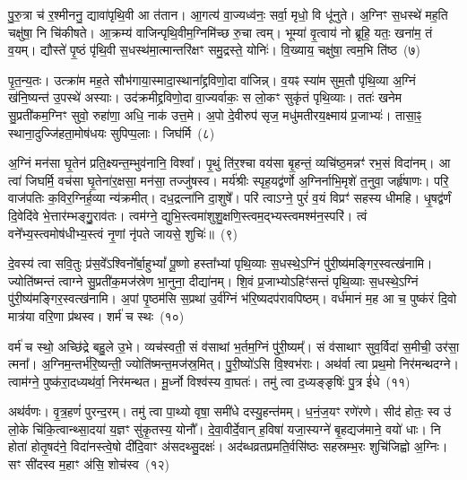 पु॒रु॒त्रा च॑ र॒श्मीननु॒ द्यावा॑पृथि॒वी आ त॑तान। आ॒गत्य॑ वा॒ज्यध्व॑नः॒ सर्वा॒ मृधो॒ वि धू॑नुते। अ॒ग्निꣳ स॒धस्थे॑ मह॒ति चक्षु॑षा॒ नि चि॑कीषते। आ॒क्रम्य॑ वाजिन्पृथि॒वीम॒ग्निमि॑च्छ रु॒चा त्वम्। भूम्या॑ वृ॒त्वाय॑ नो ब्रूहि॒ यतः॒ खना॑म॒ तं व॒यम्। द्यौस्ते॑ पृ॒ष्ठं पृ॑थि॒वी स॒धस्थ॑मा॒त्मान्तरि॑क्षꣳ समु॒द्रस्ते॒ योनिः॑। वि॒ख्याय॒ चक्षु॑षा॒ त्वम॒भि ति॑ष्ठ~(७)

पृ॒त॒न्य॒तः। उत्क्रा॑म मह॒ते सौभ॑गाया॒स्मादा॒स्थाना᳚द्द्रविणो॒दा वा॑जिन्न्। व॒यꣴ स्या॑म सुम॒तौ पृ॑थि॒व्या अ॒ग्निं ख॑नि॒ष्यन्त॑ उ॒पस्थे॑ अस्याः। उद॑क्रमीद्द्रविणो॒दा वा॒ज्यर्वाकः॒ स लो॒कꣳ सुकृ॑तं पृथि॒व्याः। ततः॑ खनेम सु॒प्रती॑कम॒ग्निꣳ सुवो॒ रुहा॑णा॒ अधि॒ नाक॑ उत्त॒मे। अ॒पो दे॒वीरुप॑ सृज॒ मधु॑मतीरय॒क्ष्माय॑ प्र॒जाभ्यः॑। तासा॒ꣴ॒ स्थाना॒दुज्जि॑हता॒मोष॑धयः सुपिप्प॒लाः। जिघ॑र्मि~(८)

अ॒ग्निं मन॑सा घृ॒तेन॑ प्रति॒क्ष्यन्त॒म्भुव॑नानि॒ विश्वा᳚। पृ॒थुं ति॑र॒श्चा वय॑सा बृ॒हन्तं॒ व्यचि॑ष्ठ॒मन्नꣳ॑ रभ॒सं विदा॑नम्। आ त्वा॑ जिघर्मि॒ वच॑सा घृ॒तेना॑र॒क्षसा॒ मन॑सा॒ तज्जु॑षस्व। मर्य॑श्रीः स्पृह॒यद्व॑र्णो अ॒ग्निर्नाभि॒मृशे॑ त॒नुवा॒ जर्\mbox{}हृ॑षाणः। परि॒ वाज॑पतिः क॒विर॒ग्निर्\mbox{}ह॒व्या न्य॑क्रमीत्। दध॒द्रत्ना॑नि दा॒शुषे᳚। परि॑ त्वाऽग्ने॒ पुरं॑ व॒यं विप्रꣳ॑ सहस्य धीमहि। धृ॒षद्व॑र्णं दि॒वेदि॑वे भे॒त्तार॑म्भङ्गु॒॒राव॑तः। त्वम॑ग्ने॒ द्युभि॒स्त्वमा॑शुशु॒क्षणि॒स्त्वम॒द्भ्यस्त्वमश्म॑न॒स्परि॑। त्वं वने᳚भ्य॒स्त्वमोष॑धीभ्य॒स्त्वं नृ॒णां नृ॑पते जायसे॒ शुचिः॑॥~(९)

{\anuvakamend[{प्र॒तूर्व॒न्थ्सूर्य॑स्य तिष्ठ॒ जिघ॑र्मि भे॒त्तारं॑ विꣳश॒तिश्च॑}]}%

दे॒वस्य॑ त्वा सवि॒तुः प्र॑स॒वे᳚\-ऽश्विनो᳚र्बा॒हु\-भ्यां᳚ पू॒ष्णो हस्ता᳚भ्यां पृथि॒व्याः स॒धस्थे॒\-ऽग्निं पु॑री॒ष्य॑मङ्गिर॒स्व\-त्ख॑नामि। ज्योति॑ष्मन्तं त्वाग्ने सु॒प्रती॑क॒मज॑स्रेण भा॒नुना॒ दीद्या॑नम्। शि॒वं प्र॒जाभ्यो\-ऽहिꣳ॑सन्तं पृथि॒व्याः स॒धस्थे॒\-ऽग्निं पु॑री॒ष्य॑मङ्गिर॒स्वत्ख॑नामि। अ॒पां पृ॒ष्ठम॑सि स॒प्रथा॑ उ॒र्व॑ग्निं भ॑रि॒ष्यदप॑रावपिष्ठम्। वर्ध॑मानं म॒ह आ च॒ पुष्क॑रं दि॒वो मात्र॑या वरि॒णा प्र॑थस्व। शर्म॑ च स्थः~(१०)

वर्म॑ च स्थो॒ अच्छि॑द्रे बहु॒ले उ॒भे। व्यच॑स्वती॒ सं व॑साथां भ॒र्तम॒ग्निं पु॑री॒ष्यम्᳚। सं व॑साथाꣳ सुव॒र्विदा॑ स॒मीची॒ उर॑सा॒ त्मना᳚। अ॒ग्निम॒न्तर्भ॑रि॒ष्यन्ती॒ ज्योति॑ष्मन्त॒मज॑स्र॒मित्। पु॒री॒ष्यो॑\-ऽसि वि॒श्वभ॑राः। अथ॑र्वा त्वा प्रथ॒मो निर॑मन्थदग्ने। त्वाम॑ग्ने॒ पुष्क॑रा॒दध्यथ॑र्वा॒ निर॑मन्थत। मू॒र्ध्नो विश्व॑स्य वा॒घतः॑। तमु॑ त्वा द॒ध्यङ्ङृषिः॑ पु॒त्र ई॑धे~(११)

अथ॑र्वणः। वृ॒त्र॒हणं॑ पुरन्द॒रम्। तमु॑ त्वा पा॒थ्यो वृषा॒ समी॑धे दस्यु॒हन्त॑मम्। ध॒नं॒ज॒यꣳ रणे॑रणे। सीद॑ होतः॒ स्व उ॑ लो॒के चि॑कि॒त्वान्थ्सा॒दया॑ य॒ज्ञꣳ सु॑कृ॒तस्य॒ योनौ᳚। दे॒वा॒वीर्दे॒वान् ह॒विषा॑ यजा॒स्यग्ने॑ बृ॒हद्यज॑माने॒ वयो॑ धाः। नि होता॑ होतृ॒षद॑ने॒ विदा॑नस्त्वे॒षो दी॑दि॒वाꣳ अ॑सदथ्सु॒दक्षः॑। अद॑ब्धव्रतप्रमति॒र्वसि॑ष्ठः सहस्रम्भ॒रः शुचि॑जिह्वो अ॒ग्निः। सꣳ सी॑दस्व म॒हाꣳ अ॑सि॒ शोच॑स्व~(१२)

